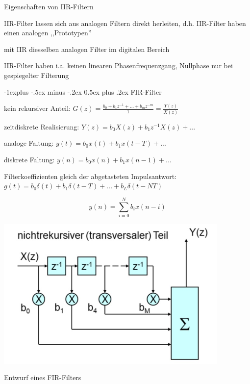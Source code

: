\documentclass[a4paper]{article}
\makeatletter
\renewcommand{\subsection}{\@startsection{subsection}{2}{0mm}%
 {-1explus -.5ex minus -.2ex}%
 {0.5ex plus .2ex}%
 {\normalfont\normalsize\bfseries}}
\makeatother
\begin{document}
\begin{multicols}{3}
  Eigenschaften von IIR-Filtern

  \begin{itemize*}
    \item IIR-Filter lassen sich aus analogen Filtern direkt herleiten, d.h. IIR-Filter haben einen analogen ,,Prototypen''
    \item mit IIR diesselben analogen Filter im digitalen Bereich
    \item IIR-Filter haben i.a. keinen linearen Phasenfrequenzgang, Nullphase nur bei gespiegelter Filterung
  \end{itemize*}

  \subsection{FIR-Filter}\label{fir-filter}

  \begin{itemize*}
    \item kein rekursiver Anteil: $G(z)=\frac{b_0+b_1z^{-1}+...+b_mz^{-m}}{1}=\frac{Y(z)}{X(z)}$
    \item zeitdiskrete Realisierung: $Y(z)=b_0X(z)+b_1z^{-1}X(z)+...$
    \item analoge Faltung: $y(t)=b_0x(t)+b_1x(t-T)+...$
    \item diskrete Faltung: $y(n)=b_0x(n)+b_1x(n-1)+...$
    \item Filterkoeffizienten gleich der abgetasteten Impulsantwort: $g(t)=b_0\delta(t)+b_1\delta(t-T)+...+b_L\delta(t-NT)$
  \end{itemize*}

  $$y(n)=\sum_{i=0}^N b_ix(n-i)$$

  \begin{itemize*}
    \item \includegraphics[width=.5\linewidth]{Assets/Biosignalverarbeitung-fir-nichtrekursiv.png}
  \end{itemize*}

  Entwurf eines FIR-Filters


\end{multicols}
\end{document}
